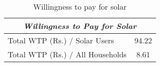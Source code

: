 \begin{table}[htbp]\centering
\def\sym#1{\ifmmode^{#1}\else\(^{#1}\)\fi}
\caption{Willingness to pay for solar\label {tab1}}
\begin{tabular}{l*{1}{c}}
\toprule
 \multicolumn{2}{c}{\emph{Willingness to Pay for Solar}}          \\
\midrule
Total WTP (Rs.) / Solar Users&       94.22\\
Total WTP (Rs.) / All Households&        8.61\\
\bottomrule
\end{tabular}
\end{table}
